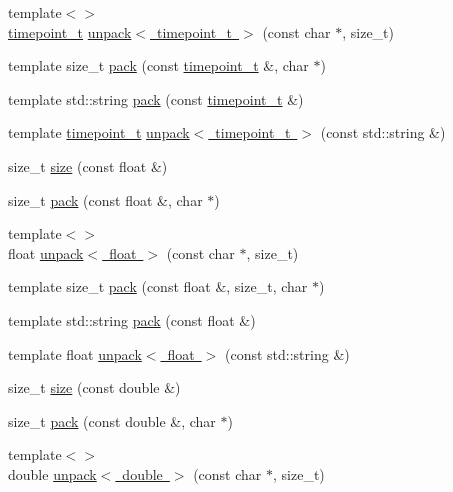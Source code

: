 \begin{DoxyCompactItemize}
\item 
{\footnotesize template$<$$>$ }\\\mbox{\hyperlink{namespaceebml_a7e667ec3fe8b51fb5b8f9690734d8638}{timepoint\+\_\+t}} \mbox{\hyperlink{namespaceebml_a939a46f36f4c7e9eaf14bc0ea612256c}{unpack$<$ timepoint\+\_\+t $>$}} (const char $\ast$, size\+\_\+t)
\item 
template size\+\_\+t \mbox{\hyperlink{namespaceebml_a0292a5a59fc28b1537dcf2d1e2c9cf2d}{pack}} (const \mbox{\hyperlink{namespaceebml_a7e667ec3fe8b51fb5b8f9690734d8638}{timepoint\+\_\+t}} \&, char $\ast$)
\item 
template std\+::string \mbox{\hyperlink{namespaceebml_a5f46d1f43787604ff84e25a0115d08cd}{pack}} (const \mbox{\hyperlink{namespaceebml_a7e667ec3fe8b51fb5b8f9690734d8638}{timepoint\+\_\+t}} \&)
\item 
template \mbox{\hyperlink{namespaceebml_a7e667ec3fe8b51fb5b8f9690734d8638}{timepoint\+\_\+t}} \mbox{\hyperlink{namespaceebml_ac97339d25d5dab88390116547e0ef400}{unpack$<$ timepoint\+\_\+t $>$}} (const std\+::string \&)
\item 
size\+\_\+t \mbox{\hyperlink{namespaceebml_ac5f0085d005103d2eb42e098b7d45c15}{size}} (const float \&)
\item 
size\+\_\+t \mbox{\hyperlink{namespaceebml_a9a1c3387186ced48928b78f0404924fd}{pack}} (const float \&, char $\ast$)
\item 
{\footnotesize template$<$$>$ }\\float \mbox{\hyperlink{namespaceebml_a9055e0d919f5e12fd661512096c811d1}{unpack$<$ float $>$}} (const char $\ast$, size\+\_\+t)
\item 
template size\+\_\+t \mbox{\hyperlink{namespaceebml_a2f3ac2d3e5ba0655228ae2a4a046a79f}{pack}} (const float \&, size\+\_\+t, char $\ast$)
\item 
template std\+::string \mbox{\hyperlink{namespaceebml_acbb370dedf65bee76a4e77f8107e6b31}{pack}} (const float \&)
\item 
template float \mbox{\hyperlink{namespaceebml_a34096c5ab0e26fba384ea9d910a5a393}{unpack$<$ float $>$}} (const std\+::string \&)
\item 
size\+\_\+t \mbox{\hyperlink{namespaceebml_a2fe5501da3393b9c982848aa5e61c372}{size}} (const double \&)
\item 
size\+\_\+t \mbox{\hyperlink{namespaceebml_ad562523994b9b844a2ed42f2c9dc0743}{pack}} (const double \&, char $\ast$)
\item 
{\footnotesize template$<$$>$ }\\double \mbox{\hyperlink{namespaceebml_a8fc03073fb4d10e4aef90a2985201603}{unpack$<$ double $>$}} (const char $\ast$, size\+\_\+t)

\end{DoxyCompactItemize}
